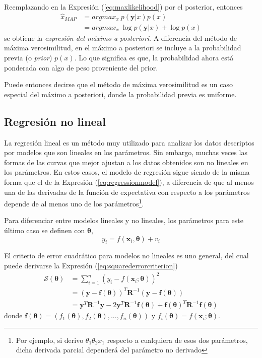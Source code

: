 Reemplazando en la Expresión (\ref{eq:maxlikelihood}) por el posterior, entonces
\begin{align}
    \hat{x}_{MAP} &= argmax_x\ p(\bm{y}|x)p(x) \\
                  &= argmax_x\ \log p(\bm{y}|x) + \log p(x)
\end{align}
se obtiene la \textit{expresión del máximo a posteriori}. A diferencia del método de máxima verosimilitud, en el máximo a posteriori se incluye a la probabilidad previa (o \textit{prior}) $p(x)$. Lo que significa es que, la probabilidad ahora está ponderada con algo de peso proveniente del prior.

Puede entonces decirse que el método de máxima verosimilitud es un caso especial del máximo a posteriori, donde la probabilidad previa es uniforme.

\subsection{Regresión no lineal}

La regresión lineal es un método muy utilizado para analizar los datos descriptos por modelos que son lineales en los parámetros. Sin embargo, muchas veces las formas de las curvas que mejor ajustan a los datos obtenidos son no lineales en los parámetros. En estos casos, el modelo de regresión sigue siendo de la misma forma que el de la Expresión (\ref{eq:regressionmodel}), a diferencia de que al menos una de las derivadas de la función de expectativa con respecto a los parámetros depende de al menos uno de los parámetros\footnote{Por ejemplo, si derivo $\theta_1 \theta_2 x_1$ respecto a cualquiera de esos dos parámetros, dicha derivada parcial dependerá del parámetro no derivado}.

Para diferenciar entre modelos lineales y no lineales, los parámetros para este último caso se definen con $\bm{\theta}$,
\begin{equation}
    y_i = f(\bm{x}_i, \bm{\theta}) + v_i
    \label{eq:nonlinearregressionmodel}
\end{equation}

El criterio de error cuadrático para modelos no lineales es uno general, del cual puede derivarse la Expresión (\ref{eq:squarederrorcriterion})
\begin{align}
    \mathscr{S}(\bm{\theta}) &= \sum_{i=1}^n (y_i - f(\bm{x}_i;\bm{\theta}))^2 \\
                   &= (\bm{y} - \bm{f}(\bm{\theta}))^T\bm{R}^{-1}(\bm{y} - \bm{f}(\bm{\theta})) \\
                   &= \bm{y}^T \bm{R}^{-1}\bm{y} - 2\bm{y}^T\bm{R}^{-1}\bm{f}(\bm{\theta}) + \bm{f}(\bm{\theta})^T\bm{R}^{-1}\bm{f}(\bm{\theta})
    \label{eq:generalsquarederrorcriterion}
\end{align}
donde $\bm{f}(\bm{\theta}) = (f_1(\bm{\theta}), f_2(\bm{\theta}), ..., f_n(\bm{\theta}))$ y $f_i(\bm{\theta}) = f(\bm{x}_i;\bm{\theta})$.

